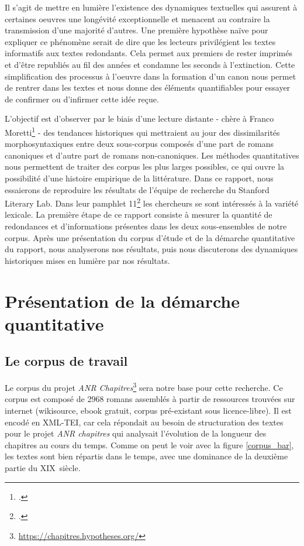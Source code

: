\documentclass[a4paper,twoside,12pt]{book}
\begin{document}
Il s'agit de mettre en lumière l'existence des dynamiques textuelles qui assurent à certaines oeuvres une longévité exceptionnelle et menacent au contraire la transmission d'une majorité d'autres. Une première hypothèse naïve pour expliquer ce phénomène serait de dire que les lecteurs privilégient les textes informatifs aux textes redondants. Cela permet aux premiers de rester imprimés et d'être republiés au fil des années et condamne les seconds à l'extinction. Cette simplification des processus à l'oeuvre dans la formation d'un canon nous permet de rentrer dans les textes et nous donne des éléments quantifiables pour essayer de confirmer ou d'infirmer cette idée reçue. 

L'objectif est d'observer par le biais d'une lecture distante - chère à Franco Moretti\footcites{moretti_graphs_2005} - des tendances historiques qui mettraient au jour des dissimilarités morphosyntaxiques entre deux sous-corpus composés d'une part de romans \og canoniques\fg{} et d'autre part de romans \og non-canoniques\fg. Les méthodes quantitatives nous permettent de traiter des corpus les plus larges possibles, ce qui ouvre la possibilité d'une histoire empirique de la littérature. Dans ce rapport, nous essaierons de reproduire les résultats de l'équipe de recherche du Stanford Literary Lab. Dans leur pamphlet 11\footcites{mark_algee-hewitt_canonarchive_2016} les chercheurs se sont intéressés à la variété lexicale. La première étape de ce rapport consiste à mesurer la quantité de redondances et d'informations présentes dans les deux sous-ensembles de notre corpus. Après une présentation du corpus d'étude et de la démarche quantitative du rapport, nous analyserons nos résultats, puis nous discuterons des dynamiques historiques mises en lumière par nos résultats.

\chapter{Présentation de la démarche quantitative}

\section{Le corpus de travail}
Le corpus du projet \textit{ANR Chapitres}\footnote{\url{https://chapitres.hypotheses.org/}} sera notre base pour cette recherche. Ce corpus est composé de 2968 romans assemblés à partir de ressources trouvées sur internet (wikisource, ebook gratuit, corpus pré-existant sous licence-libre). Il est encodé en XML-TEI, car cela répondait au besoin de structuration des textes pour le projet \textit{ANR chapitres} qui analysait l'évolution de la longueur des chapitres au cours du temps. Comme on peut le voir avec la figure \ref{corpus_bar}, les textes sont bien répartis dans le temps, avec une dominance de la deuxième partie du XIX\ieme ~siècle. 
\end{document}
